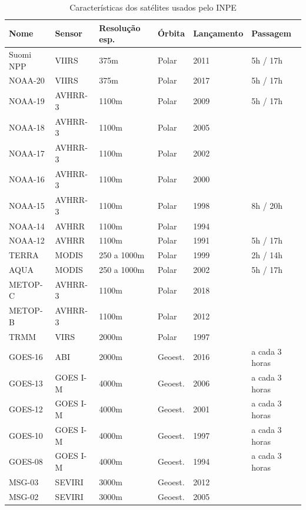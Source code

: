 \documentclass[cic,tc]{iiufrgs}
\begin{document}
\begin{table}[h!]
\centering
\caption{Características dos satélites usados pelo INPE}
\begin{tabular}{ | l l l l l l | }
\hline
  Nome    & Sensor & Resolução esp. & Órbita & Lançamento & Passagem \\
\hline
  Suomi NPP & VIIRS    & 375m        & Polar   & 2011 & 5h / 17h \\
  NOAA-20 & VIIRS    & 375m        & Polar   & 2017 & 5h / 17h \\
  NOAA-19 & AVHRR-3  & 1100m       & Polar   & 2009 & 5h / 17h \\
  NOAA-18 & AVHRR-3  & 1100m       & Polar   & 2005 &  \\
  NOAA-17 & AVHRR-3  & 1100m       & Polar   & 2002 &  \\
  NOAA-16 & AVHRR-3  & 1100m       & Polar   & 2000 &  \\
  NOAA-15 & AVHRR-3  & 1100m       & Polar   & 1998 & 8h / 20h \\
  NOAA-14 & AVHRR    & 1100m       & Polar   & 1994 & \\
  NOAA-12 & AVHRR    & 1100m       & Polar   & 1991 & 5h / 17h \\
  TERRA   & MODIS    & 250 a 1000m & Polar   & 1999 & 2h / 14h \\
  AQUA    & MODIS    & 250 a 1000m & Polar   & 2002 & 5h / 17h \\
  METOP-C & AVHRR-3  & 1100m       & Polar   & 2018 &  \\
  METOP-B & AVHRR-3  & 1100m       & Polar   & 2012 &  \\
  TRMM    & VIRS     & 2000m       & Polar   & 1997 &  \\
  GOES-16 & ABI      & 2000m       & Geoest. & 2016 & a cada 3 horas \\
  GOES-13 & GOES I-M & 4000m       & Geoest. & 2006 & a cada 3 horas \\
  GOES-12 & GOES I-M & 4000m       & Geoest. & 2001 & a cada 3 horas \\
  GOES-10 & GOES I-M & 4000m       & Geoest. & 1997 & a cada 3 horas \\
  GOES-08 & GOES I-M & 4000m       & Geoest. & 1994 & a cada 3 horas \\
  MSG-03  & SEVIRI   & 3000m       & Geoest. & 2012 &  \\
  MSG-02  & SEVIRI   & 3000m       & Geoest. & 2005 &  \\
 \hline
\end{tabular}
\label{table:satelites}
\end{table}
\end{document}
